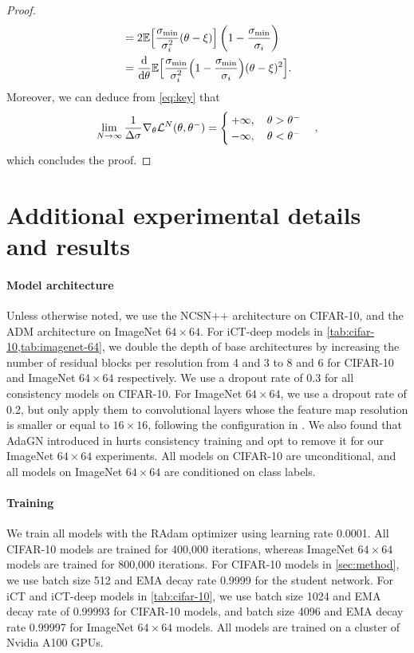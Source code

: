 \begin{proof}
\begin{align*}
    &=  2\mathbb{E}\Big[\frac{\sigma_\text{min}}{\sigma_i^2}(\theta - \xi) \Big]\left(1 - \frac{\sigma_\text{min}}{\sigma_{i}}\right)\\
    &=\frac{\mathop{}\!\mathrm{d}}{\mathop{}\!\mathrm{d}\theta} \mathbb{E}\Big[ \frac{\sigma_\text{min}}{\sigma_i^2}\Big( 1 - \frac{\sigma_\text{min}}{\sigma_i} \Big)(\theta - \xi)^2 \Big].
\end{align*}
Moreover, we can deduce from \cref{eq:key} that
\begin{align*}
    \lim_{N\to\infty}\frac{1}{\Delta \sigma} \nabla_\theta \mathcal{L}^N(\theta, \theta^{-}) = \begin{cases}
        +\infty, \quad \theta > \theta^-\\
        -\infty, \quad \theta < \theta^-
    \end{cases},
\end{align*}
which concludes the proof.
\end{proof}

\section{Additional experimental details and results}\label{app:exp}

\paragraph{Model architecture} Unless otherwise noted, we use the NCSN++ architecture \citep{song2021scorebased} on CIFAR-10, and the ADM architecture \citep{dhariwal2021diffusion} on ImageNet $64\times 64$. For iCT-deep models in \cref{tab:cifar-10,tab:imagenet-64}, we double the depth of base architectures by increasing the number of residual blocks per resolution from 4 and 3 to 8 and 6 for CIFAR-10 and ImageNet $64\times 64$ respectively. We use a dropout rate of 0.3 for all consistency models on CIFAR-10. For ImageNet $64\times 64$, we use a dropout rate of 0.2, but only apply them to convolutional layers whose the feature map resolution is smaller or equal to $16\times 16$, following the configuration in \citet{hoogeboom2023simple}. We also found that AdaGN introduced in \citet{dhariwal2021diffusion} hurts consistency training and opt to remove it for our ImageNet $64\times 64$ experiments. All models on CIFAR-10 are unconditional, and all models on ImageNet $64\times 64$ are conditioned on class labels.

\paragraph{Training} We train all models with the RAdam optimizer \citep{liu2019variance} using learning rate 0.0001. All CIFAR-10 models are trained for 400,000 iterations, whereas ImageNet $64\times 64$ models are trained for 800,000 iterations. For CIFAR-10 models in \cref{sec:method}, we use batch size 512 and EMA decay rate 0.9999 for the student network. For iCT and iCT-deep models in \cref{tab:cifar-10}, we use batch size 1024 and EMA decay rate of 0.99993 for CIFAR-10 models, and batch size 4096 and EMA decay rate 0.99997 for ImageNet $64\times 64$ models. All models are trained on a cluster of Nvidia A100 GPUs.

